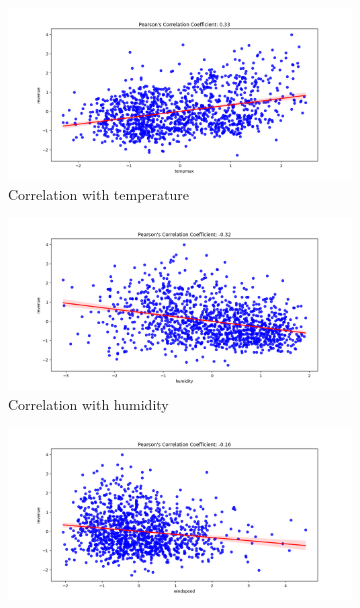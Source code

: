\begin{figure}[h!]
    \centering
    \begin{subfigure}[b]{0.3\textwidth}
        \includegraphics[width=\textwidth]{../../preprocessing/plots/tempmax.png}
        \caption{Correlation with temperature}
    \end{subfigure}
    \begin{subfigure}[b]{0.3\textwidth}
        \includegraphics[width=\textwidth]{../../preprocessing/plots/humidity.png}
        \caption{Correlation with humidity}
    \end{subfigure}
    \begin{subfigure}[b]{0.3\textwidth}
        \includegraphics[width=\textwidth]{../../preprocessing/plots/windspeed.png}

\end{subfigure}
\end{figure}
